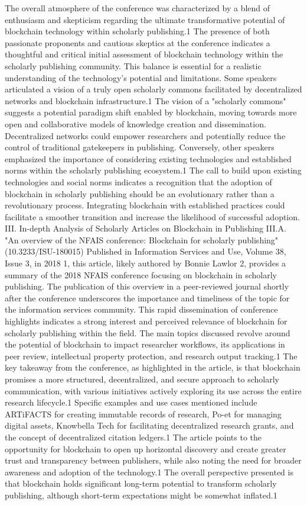\documentclass{article}
\begin{document}
The overall atmosphere of the conference was characterized by a blend of enthusiasm and skepticism regarding the ultimate transformative potential of blockchain technology within scholarly publishing.1 The presence of both passionate proponents and cautious skeptics at the conference indicates a thoughtful and critical initial assessment of blockchain technology within the scholarly publishing community. This balance is essential for a realistic understanding of the technology's potential and limitations. Some speakers articulated a vision of a truly open scholarly commons facilitated by decentralized networks and blockchain infrastructure.1 The vision of a "scholarly commons" suggests a potential paradigm shift enabled by blockchain, moving towards more open and collaborative models of knowledge creation and dissemination. Decentralized networks could empower researchers and potentially reduce the control of traditional gatekeepers in publishing. Conversely, other speakers emphasized the importance of considering existing technologies and established norms within the scholarly publishing ecosystem.1 The call to build upon existing technologies and social norms indicates a recognition that the adoption of blockchain in scholarly publishing should be an evolutionary rather than a revolutionary process. Integrating blockchain with established practices could facilitate a smoother transition and increase the likelihood of successful adoption.
III. In-depth Analysis of Scholarly Articles on Blockchain in Publishing
III.A. "An overview of the NFAIS conference: Blockchain for scholarly publishing" (10.3233/ISU-180015)
Published in Information Services and Use, Volume 38, Issue 3, in 2018 1, this article, likely authored by Bonnie Lawlor 2, provides a summary of the 2018 NFAIS conference focusing on blockchain in scholarly publishing. The publication of this overview in a peer-reviewed journal shortly after the conference underscores the importance and timeliness of the topic for the information services community. This rapid dissemination of conference highlights indicates a strong interest and perceived relevance of blockchain for scholarly publishing within the field. The main topics discussed revolve around the potential of blockchain to impact researcher workflows, its applications in peer review, intellectual property protection, and research output tracking.1 The key takeaway from the conference, as highlighted in the article, is that blockchain promises a more structured, decentralized, and secure approach to scholarly communication, with various initiatives actively exploring its use across the entire research lifecycle.1 Specific examples and use cases mentioned include ARTiFACTS for creating immutable records of research, Po-et for managing digital assets, Knowbella Tech for facilitating decentralized research grants, and the concept of decentralized citation ledgers.1 The article points to the opportunity for blockchain to open up horizontal discovery and create greater trust and transparency between publishers, while also noting the need for broader awareness and adoption of the technology.1 The overall perspective presented is that blockchain holds significant long-term potential to transform scholarly publishing, although short-term expectations might be somewhat inflated.1
\end{document}
